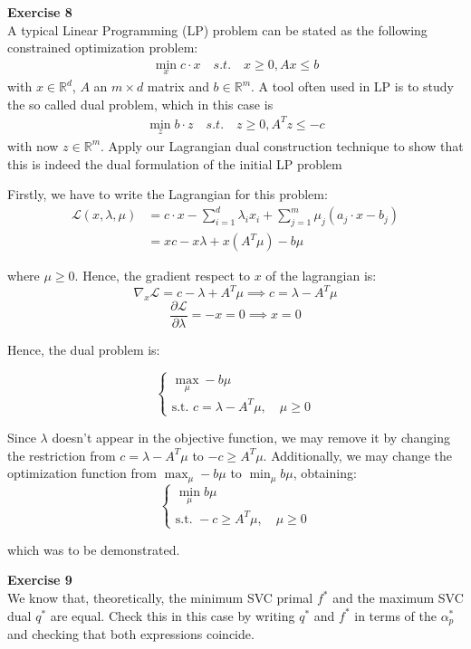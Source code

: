 \documentclass[11pt,table]{article}
\newenvironment{problem}[2][Exercise]
{ \begin{mdframed}[backgroundcolor=gray!20] \textbf{#1 #2} \\}
	{  \end{mdframed}}
\newcommand\R{\mathbb R}
\begin{document}
\begin{problem}{8}
A typical Linear Programming (LP) problem can be stated as the following constrained optimization problem:
\begin{align*}
	\min_x c \cdot x \quad s.t. \quad x \geq 0, Ax \leq b
\end{align*}
with \(x \in \R^d\), \(A\) an \(m \times d\) matrix and \(b \in \R^m\). A tool often used in LP is to study the so called dual problem, which in this case is
\begin{align*}
	\min_{z} b \cdot z \quad s.t. \quad z \geq 0, A^T z \leq -c
\end{align*}
with now \(z \in \R^m\). Apply our Lagrangian dual construction technique to show that this is indeed the dual formulation of the initial LP problem
\end{problem}

Firstly, we have to write the Lagrangian for this problem:
\begin{align*}
	\mathcal L(x,\lambda,\mu) & = c \cdot x -  \sum_{i=1}^d \lambda_i x_i  + \sum_{j=1}^m \mu_j(a_j \cdot x - b_j) \\
	                          & = xc - x\lambda + x\left(A^T \mu\right) - b\mu
\end{align*}

where $\mu \ge 0$. Hence, the gradient respect to \(x\) of the lagrangian is:
\[
	\nabla_x \mathcal L = c - \lambda + A^T \mu \implies c = \lambda - A^T\mu
\]
\[
	\frac{\partial \mathcal L}{\partial \lambda} = -x = 0 \implies x = 0
\]

Hence, the dual problem is:

\[
	\begin{cases}
		\max_\mu - b \mu \\
		\text{s.t. } c = \lambda - A^T\mu, \quad \mu \ge 0
	\end{cases}
\]

Since $\lambda$ doesn't appear in the objective function, we may remove it by changing the restriction from $c = \lambda - A^T\mu$ to $-c \geq A^T\mu$. Additionally, we may change the optimization function from $\max_\mu - b \mu$ to $\min_\mu b \mu$, obtaining:
\[
	\begin{cases}
		\min_\mu b \mu \\
		\text{s.t. } -c \ge A^T\mu, \quad \mu \ge 0
	\end{cases}
\]

which was to be demonstrated. \\

\begin{problem}{9}
We know that, theoretically, the minimum SVC primal \(f^*\) and the maximum SVC dual \(q^*\) are equal. Check this in this case by writing \(q^*\) and \(f^*\) in terms of the \(\alpha_p^*\) and checking that both expressions coincide.
\end{problem}
\end{document}
